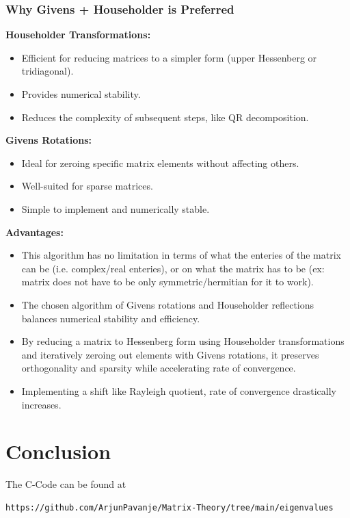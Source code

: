 \documentclass[12pt]{article}
\begin{document}
\subsubsection*{Why Givens + Householder is Preferred}
\textbf{Householder Transformations:}
\begin{itemize}
    \item Efficient for reducing matrices to a simpler form (upper Hessenberg or tridiagonal).
    \item Provides numerical stability.
    \item Reduces the complexity of subsequent steps, like QR decomposition.
\end{itemize}
\textbf{Givens Rotations:}
\begin{itemize}
    \item Ideal for zeroing specific matrix elements without affecting others.
    \item Well-suited for sparse matrices.
    \item Simple to implement and numerically stable.
\end{itemize}
\textbf{Advantages:}
\begin{itemize}
\item This algorithm has no limitation in terms of what the enteries of the matrix can be (i.e. complex/real enteries), or on what the matrix has to be (ex: matrix does not have to be only symmetric/hermitian for it to work). 
\item The chosen algorithm of Givens rotations and Householder reflections balances numerical stability and efficiency. 
\item By reducing a matrix to Hessenberg form using Householder transformations and iteratively zeroing out elements with Givens rotations, it preserves orthogonality and sparsity while accelerating rate of convergence. 
\item Implementing a shift like Rayleigh quotient, rate of convergence drastically increases. 
\end{itemize}


\section{Conclusion}
The C-Code can be found at 
{\footnotesize
\begin{lstlisting}
https://github.com/ArjunPavanje/Matrix-Theory/tree/main/eigenvalues
\end{lstlisting}
}
\end{document}
